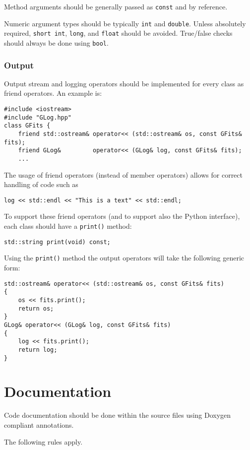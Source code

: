 \documentclass{article}[12pt,a4]
\begin{document}
Method arguments should be generally passed as {\tt const} and by reference.

Numeric argument types should be typically {\tt int} and {\tt double}.
Unless absolutely required, {\tt short int}, {\tt long}, and {\tt float} should be avoided.
True/false checks should always be done using {\tt bool}.


\subsubsection{Output}
\label{sec:output}

Output stream and logging operators should be implemented for every class as friend
operators.
An example is:
\begin{verbatim}
#include <iostream>
#include "GLog.hpp"
class GFits {
    friend std::ostream& operator<< (std::ostream& os, const GFits& fits);
    friend GLog&         operator<< (GLog& log, const GFits& fits);
    ...
\end{verbatim}
The usage of friend operators (instead of member operators) allows for correct handling
of code such as
\begin{verbatim}
log << std::endl << "This is a text" << std::endl;
\end{verbatim}
To support these friend operators (and to support also the Python interface), each class
should have a {\tt print()} method:
\begin{verbatim}
std::string print(void) const;
\end{verbatim}
Using the {\tt print()} method the output operators will take the following generic form:
\begin{verbatim}
std::ostream& operator<< (std::ostream& os, const GFits& fits)
{
    os << fits.print();
    return os;
}
GLog& operator<< (GLog& log, const GFits& fits)
{
    log << fits.print();
    return log;
}
\end{verbatim}


\section{Documentation}

Code documentation should be done within the source files using Doxygen
compliant annotations.

The following rules apply.
\end{document}
